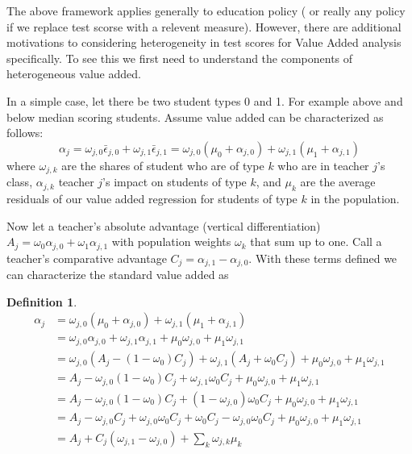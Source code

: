 \documentclass{article}
\theoremstyle{definition}
\theoremstyle{definition}
\theoremstyle{definition}
\theoremstyle{definition}
\newtheorem{definition}{Definition}
\begin{document}
   The above framework applies generally to education policy ( or really any policy if we replace test scorse with a relevent measure). However, there are additional motivations to considering heterogeneity in test scores for Value Added analysis specifically. To see this we first need to understand the components of heterogeneous value added. 
   
    In a simple case, let there be two student types 0 and 1. For example above and below median scoring students. Assume value added can be characterized as follows:
    \[
    \alpha_j = \omega_{j,0}\bar{\epsilon}_{j,0}  + \omega_{j,1}\bar{\epsilon}_{j,1} =  \omega_{j,0}(\mu_0 +\alpha_{j,0}) + \omega_{j,1}(\mu_1 +\alpha_{j,1})
    \]
    \noindent where $\omega_{j,k}$ are the shares of student who are of type $k$ who are in teacher $j$'s class, $\alpha_{j,k}$ teacher $j$'s  impact on students of type $k$, and $\mu_k$ are the average residuals of our value added regression for students of type $k$ in the population.
    
    Now let a teacher's absolute advantage (vertical differentiation) $A_j = \omega_{0}\alpha_{j,0} + \omega_{1}\alpha_{j,1}$ with population  weights $\omega_{k}$ that sum up to one. Call a teacher's comparative advantage $C_j = \alpha_{j,1} - \alpha_{j,0}$. With these terms defined we can characterize the standard value added as
    \begin{definition}
    \label{hetero_decomp}
    \begin{align*}
        \alpha_j  &= \omega_{j,0}(\mu_0 +\alpha_{j,0}) + \omega_{j,1}(\mu_1 +\alpha_{j,1})  \\
                  & =  \omega_{j,0}\alpha_{j,0} + \omega_{j,1}\alpha_{j,1}   +\mu_0 \omega_{j,0} + \mu_1 \omega_{j,1}  \\
                  & =  \omega_{j,0}(A_j -(1-\omega_{0})C_j) + \omega_{j,1}(A_j +\omega_{0}C_j)  +\mu_0 \omega_{j,0} + \mu_1 \omega_{j,1} \\
                  & =  A_j   - \omega_{j,0} (1-\omega_{0})C_j + \omega_{j,1}\omega_{0}C_j +\mu_0 \omega_{j,0} + \mu_1 \omega_{j,1} \\
                  & =  A_j   - \omega_{j,0} (1-\omega_{0})C_j + (1-\omega_{j,0})\omega_{0}C_j +\mu_0 \omega_{j,0} + \mu_1 \omega_{j,1} \\
                  & =  A_j   - \omega_{j,0} C_j +\omega_{j,0}\omega_{0}C_j + \omega_{0}C_j -\omega_{j,0}\omega_{0}C_j +\mu_0 \omega_{j,0} + \mu_1 \omega_{j,1} \\
                  & =  A_j  + C_j  ( \omega_{j,1} - \omega_{j,0} ) + \sum_k  \omega_{j,k} \mu_k
    \end{align*}
    \end{definition}
\end{document}
